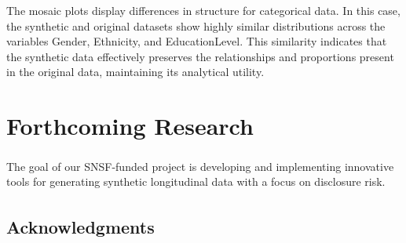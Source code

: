 \documentclass[a0,portrait]{a0poster}
\begin{document}
\begin{multicols}{3}
The mosaic plots display differences in structure for categorical data. In this case, the synthetic and original datasets show highly similar distributions across the variables Gender, Ethnicity, and EducationLevel. This similarity indicates that the synthetic data effectively preserves the relationships and proportions present in the original data, maintaining its analytical utility.

\section{Forthcoming Research}

The goal of our SNSF\textsuperscript{}-funded project is developing and implementing innovative tools for generating synthetic longitudinal data with a focus on disclosure risk.




\singlespacing
\small
\nocite{*} %
%

\subsection{\textsuperscript{}Acknowledgments}
\label{Acknowledgments}


\end{multicols}
\end{document}
